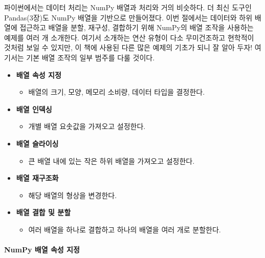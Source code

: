 \documentclass[11pt]{article}
\providecommand{\tightlist}{%
      \setlength{\itemsep}{0pt}\setlength{\parskip}{0pt}}
\begin{document}
파이썬에서는 데이터 처리는 NumPy 배열과 처리와 거의 비슷하다. 더 최신
도구인 Pandas(3장)도 NumPy 배열을 기반으로 만들어졌다. 이번 절에서는
데이터와 하위 배열에 접근하고 배열을 분할, 재구성, 결합하기 위해 NumPy의
배열 조작을 사용하는 예제를 여러 개 소개한다. 여기서 소개하는 연산
유형이 다소 무미건조하고 현학적이 것처럼 보일 수 있지만, 이 책에 사용된
다른 많은 예제의 기초가 되니 잘 알아 두자! 여기서는 기본 배열 조작의
일부 범주를 다룰 것이다.

\begin{itemize}
\tightlist
\item
  \textbf{배열 속성 지정}

  \begin{itemize}
  \tightlist
  \item
    배열의 크기, 모양, 메모리 소비량, 데이터 타입을 결정한다.
  \end{itemize}
\item
  \textbf{배열 인덱싱}

  \begin{itemize}
  \tightlist
  \item
    개별 배열 요솟값을 가져오고 설정한다.
  \end{itemize}
\item
  \textbf{배열 슬라이싱}

  \begin{itemize}
  \tightlist
  \item
    큰 배열 내에 있는 작은 하위 배열을 가져오고 설정한다.
  \end{itemize}
\item
  \textbf{배열 재구조화}

  \begin{itemize}
  \tightlist
  \item
    해당 배열의 형상을 변경한다.
  \end{itemize}
\item
  \textbf{배열 결합 및 분할}

  \begin{itemize}
  \tightlist
  \item
    여러 배열을 하나로 결합하고 하나의 배열을 여러 개로 분할한다.
  \end{itemize}
\end{itemize}

    \hypertarget{numpy-uxbc30uxc5f4-uxc18duxc131-uxc9c0uxc815}{%
\paragraph{NumPy 배열 속성
지정}\label{numpy-uxbc30uxc5f4-uxc18duxc131-uxc9c0uxc815}}
\end{document}
